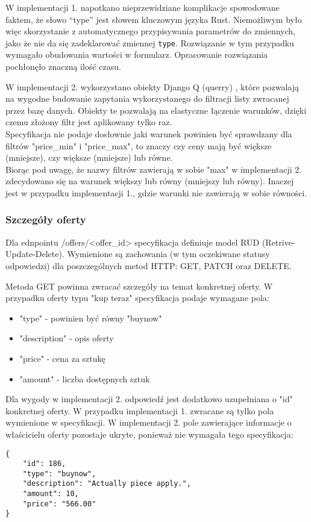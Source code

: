 \documentclass[12pt, notitlepage]{article}
\begin{document}
W implementacji 1. napotkano nieprzewidziane komplikacje spowodowane faktem, że słowo ``type'' jest słowem kluczowym języka Rust. Niemożliwym było więc skorzystanie z automatycznego przypisywania parametrów do zmiennych, jako że nie da się zadeklarować zmiennej \texttt{type}. Rozwiązanie w tym przypadku wymagało obudowania wartości w formularz. Opracowanie rozwiązania pochłonęło znaczną ilość czasu.

W implementacji 2. wykorzystano obiekty Django Q (querry) \cite{django_q}, które pozwalają na wygodne budowanie zapytania wykorzystanego do filtracji listy zwracanej przez bazę danych. Obiekty te pozwalają na elastyczne łączenie warunków, dzięki czemu złożony filtr jest aplikowany tylko raz. \\

Specyfikacja nie podaje dosłownie jaki warunek powinien być sprawdzany dla filtrów "price\_min" i "price\_max", to znaczy czy ceny mają być większe (mniejsze), czy większe (mniejsze) lub równe. \\
Biorąc pod uwagę, że nazwy filtrów zawierają w sobie "max" w implementacji 2. zdecydowano się na warunek większy lub równy (mniejszy lub równy). Inaczej jest w przypadku implementacji 1., gdzie warunki nie zawierają w sobie równości. \\

\subsubsection{Szczegóły oferty}\label{sec:details}

Dla ednpointu /offers/<offer\_id> specyfikacja definiuje model RUD (Retrive-Update-Delete). Wymienione są zachowania (w tym oczekiwane statusy odpowiedzi) dla poszczególnych metod HTTP: GET, PATCH oraz DELETE.

Metoda GET powinna zwracać szczegóły na temat konkretnej oferty. W przypadku oferty typu "kup teraz" specyfikacja podaje wymagane pola: 
\begin{itemize}
    \item "type" - powinien być równy "buynow"
    \item "description" - opis oferty
    \item "price" - cena za sztukę
    \item "amount" - liczba dostępnych sztuk
\end{itemize}

Dla wygody w implementacji 2. odpowiedź jest dodatkowo uzupełniana o "id" konkretnej oferty. W przypadku implementacji 1. zwracane są tylko pola wymienione w specyfikacji. W implementacji 2. pole zawierające informacje o właścicielu oferty pozostaje ukryte, ponieważ nie wymagała tego specyfikacja:
\begin{lstlisting}
{
    "id": 186,
    "type": "buynow",
    "description": "Actually piece apply.",
    "amount": 10,
    "price": "566.00"
}
\end{lstlisting}
\end{document}
